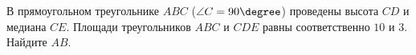 \begin{ex}
	\begin{condition}
		В прямоугольном треугольнике \( ABC  \) (\( \angle C = 90\degree \)) проведены высота \( CD  \) и медиана \( CE \). Площади треугольников \( ABC \) и \( CDE  \) равны соответственно \( 10  \) и \( 3 \). Найдите \( AB \).
	\end{condition}
\end{ex}